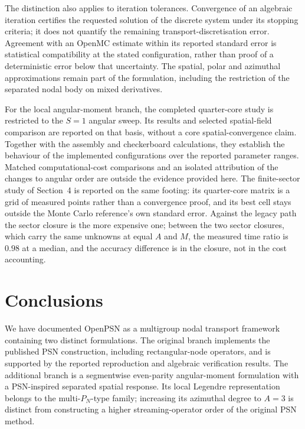 \documentclass[11pt,a4paper]{article}
\begin{document}
The distinction also applies to iteration tolerances. Convergence of an
algebraic iteration certifies the requested solution of the discrete
system under its stopping criteria; it does not quantify the remaining
transport-discretisation error. Agreement with an OpenMC estimate
within its reported standard error is statistical compatibility at the
stated configuration, rather than proof of a deterministic error below
that uncertainty. The spatial, polar and azimuthal approximations
remain part of the formulation, including the restriction of the
separated nodal body on mixed derivatives.

For the local angular-moment branch, the completed quarter-core study
is restricted to the $S{=}1$ angular sweep. Its results and selected
spatial-field comparison are reported on that basis, without a core
spatial-convergence claim. Together with the assembly and checkerboard
calculations, they establish the behaviour of the implemented
configurations over the reported parameter ranges. Matched
computational-cost comparisons and an isolated attribution of the
changes to angular order are outside the evidence provided here.
The finite-sector study of Section~4 is reported on the same footing:
its quarter-core matrix is a grid of measured points rather than a
convergence proof, and its best cell stays outside the Monte Carlo
reference's own standard error. Against the legacy path the sector closure
is the more expensive one; between the two sector closures, which carry the
same unknowns at equal $A$ and $M$, the measured time ratio is $0.98$ at a
median, and the accuracy difference is in the closure, not in the cost
accounting.

\section{Conclusions}

We have documented OpenPSN as a multigroup nodal transport framework
containing two distinct formulations. The original branch implements
the published PSN construction, including rectangular-node operators,
and is supported by the reported reproduction and algebraic
verification results. The additional branch is a segmentwise
even-parity angular-moment formulation with a PSN-inspired separated
spatial response. Its local Legendre representation belongs to the
multi-$P_N$-type family; increasing its azimuthal degree to $A{=}3$ is
distinct from constructing a higher streaming-operator order of the
original PSN method.
\end{document}
